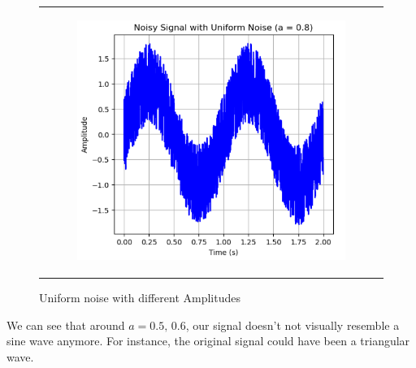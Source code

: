 \documentclass[hidelinks,12pt]{article}
\begin{document}
\begin{figure}[!h]
\begin{tabular}{c}
\begin{subfigure}[h]{0.3\textwidth}
			\end{subfigure}
			\hfill
			\begin{subfigure}[h]{0.3\textwidth}
				\centering
				\includegraphics[width=\textwidth]{figures/uniform_noise/0.8.png}
			\end{subfigure} \\
			
		\end{tabular}
		\caption{Uniform noise with different Amplitudes}
	\end{figure}
	
	 We can see that around $a=0.5,\,0.6$, our signal doesn't not visually resemble a sine wave anymore. For instance, the original signal could have been a triangular wave.
	
	\pagebreak
	
\end{document}
